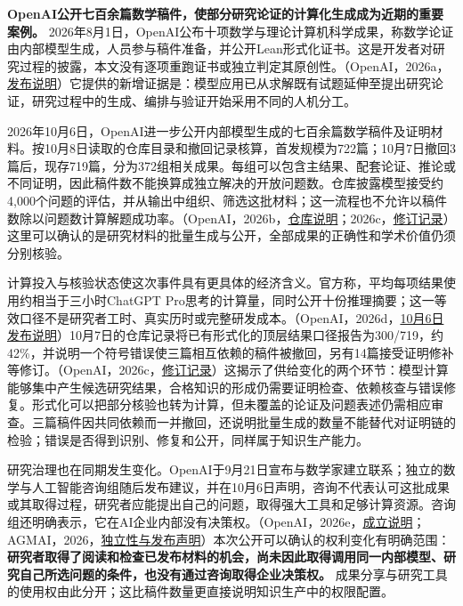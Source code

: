 \documentclass[UTF8,fontset=windows,12pt,a4paper,oneside,openany]{ctexbook}
\begin{document}
\textbf{OpenAI公开七百余篇数学稿件，使部分研究论证的计算化生成成为近期的重要案例。} 2026年8月1日，OpenAI公布十项数学与理论计算机科学成果，称数学论证由内部模型生成，人员参与稿件准备，并公开Lean形式化证书。这是开发者对研究过程的披露，本文没有逐项重跑证书或独立判定其原创性。（OpenAI，2026a，\href{https://openai.com/index/ten-advances-in-mathematics/}{发布说明}）它提供的新增证据是：模型应用已从求解既有试题延伸至提出研究论证，研究过程中的生成、编排与验证开始采用不同的人机分工。

2026年10月6日，OpenAI进一步公开内部模型生成的七百余篇数学稿件及证明材料。按10月8日读取的仓库目录和撤回记录核算，首发规模为722篇；10月7日撤回3篇后，现存719篇，分为372组相关成果。每组可以包含主结果、配套论证、推论或不同证明，因此稿件数不能换算成独立解决的开放问题数。仓库披露模型接受约4,000个问题的评估，并从输出中组织、筛选这批材料；这一流程也不允许以稿件数除以问题数计算解题成功率。（OpenAI，2026b，\href{https://github.com/openai/math}{仓库说明}；2026c，\href{https://github.com/openai/math/blob/main/history.md}{修订记录}）这里可以确认的是研究材料的批量生成与公开，全部成果的正确性和学术价值仍须分别核验。

计算投入与核验状态使这次事件具有更具体的经济含义。官方称，平均每项结果使用约相当于三小时ChatGPT Pro思考的计算量，同时公开十份推理摘要；这一等效口径不是研究者工时、真实历时或完整研发成本。（OpenAI，2026d，\href{https://openai.com/index/sharing-ai-progress-in-mathematics/}{10月6日发布说明}）10月7日的仓库记录将已有形式化的顶层结果口径报告为300/719，约42\%，并说明一个符号错误使三篇相互依赖的稿件被撤回，另有14篇接受证明修补等修订。（OpenAI，2026c，\href{https://github.com/openai/math/blob/main/history.md}{修订记录}）这揭示了供给变化的两个环节：模型计算能够集中产生候选研究结果，合格知识的形成仍需要证明检查、依赖核查与错误修复。形式化可以把部分核验也转为计算，但未覆盖的论证及问题表述仍需相应审查。三篇稿件因共同依赖而一并撤回，还说明批量生成的数量不能替代对证明链的检验；错误是否得到识别、修复和公开，同样属于知识生产能力。

研究治理也在同期发生变化。OpenAI于9月21日宣布与数学家建立联系；独立的数学与人工智能咨询组随后发布建议，并在10月6日声明，咨询不代表认可这批成果或其取得过程，研究者应能提出自己的问题，取得强大工具和足够计算资源。咨询组还明确表示，它在AI企业内部没有决策权。（OpenAI，2026e，\href{https://openai.com/index/advisory-group-on-mathematics-and-ai/}{成立说明}；AGMAI，2026，\href{https://agmai.org/}{独立性与发布声明}）本次公开可以确认的权利变化有明确范围：\textbf{研究者取得了阅读和检查已发布材料的机会，尚未因此取得调用同一内部模型、研究自己所选问题的条件，也没有通过咨询取得企业决策权。} 成果分享与研究工具的使用权由此分开；这比稿件数量更直接说明知识生产中的权限配置。
\end{document}
